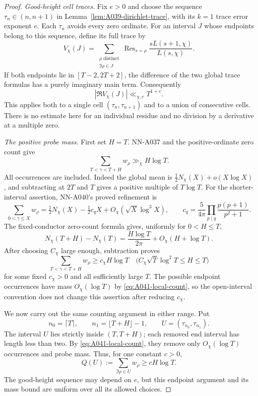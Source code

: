 \begin{proof}
\emph{Good-height cell traces.}
Fix $e>0$ and choose the sequence $\tau_n\in(n,n+1)$ in
Lemma~\ref{lem:A039-dirichlet-trace}, with its $k=1$ trace
error exponent $e$. Each $\tau_n$ avoids every zero ordinate.
For an interval $J$ whose endpoints belong to this sequence,
define its full trace by
\[
 V_\chi(J)=\sum_{\substack{\rho\text{ distinct}\\\Im\rho\in J}}
       \operatorname{Res}_{s=\rho}
                \frac{sL(s+1,\chi)}{L(s,\chi)}.
\]
If both endpoints lie in $[T-2,2T+2]$, the difference of the
two global trace formulas has a purely imaginary main term.
Consequently
\begin{equation}\label{eq:A041-trace-bound}
                   |\Re V_\chi(J)|\ll_{\chi,e}T^{1+e}.
\end{equation}
This applies both to a single cell $(\tau_n,\tau_{n+1})$ and
to a union of consecutive cells. There is no estimate here for
an individual residue and no division by a derivative at a
multiple zero.

\emph{The positive probe mass.}
First set $H=T$. NN-A037 and the positive-ordinate zero count give
\[
 \sum_{T<\gamma<T+H}w_\rho\gg_\chi H\log T.
\]
All occurrences are included. Indeed the global mean is
$\frac12N_\chi(X)+o(X\log X)$, and subtracting at $2T$ and
$T$ gives a positive multiple of $T\log T$.
For the shorter-interval assertion, NN-A040's proved refinement is
\[
 \sum_{0<\gamma\le X}w_\rho
 =\tfrac12N_\chi(X)-\tfrac12c_qX
                  +O_\chi(\sqrt X\log^3X),\qquad
 c_q=\frac5{4\pi}\prod_{p\mid q}\frac{p(p+1)}{p^2+1}.
\]
The fixed-conductor zero-count formula gives, uniformly for
$0<H\le T$,
\[
 N_\chi(T+H)-N_\chi(T)
       =\frac{H\log T}{2\pi}+O_\chi(H+\log T).
\]
After choosing $C_\chi$ large enough, subtraction proves
\begin{equation}\label{eq:A041-probe}
 \sum_{T<\gamma<T+H}w_\rho\ge c_\chi H\log T
 \quad\bigl(C_\chi\sqrt T\log^2T\le H\le T\bigr)
\end{equation}
for some fixed $c_\chi>0$ and all sufficiently large $T$.
The possible endpoint occurrences have mass $O_\chi(\log T)$
by \eqref{eq:A041-local-count}, so the open-interval convention
does not change this assertion after reducing $c_\chi$.

We now carry out the same counting argument in either range.
Put
\[
 n_0=\lceil T\rceil,\qquad n_1=\lfloor T+H\rfloor-1,
 \qquad U=(\tau_{n_0},\tau_{n_1}).
\]
The interval $U$ lies strictly inside $(T,T+H)$; each removed
end interval has length less than two. By
\eqref{eq:A041-local-count}, they remove only $O_\chi(\log T)$
occurrences and probe mass. Thus, for one constant $c>0$,
\begin{equation}\label{eq:A041-interior-mass}
                 Q(U):=\sum_{\Im\rho\in U}w_\rho
                                \ge c H\log T.
\end{equation}
The good-height sequence may depend on $e$, but this endpoint
argument and its mass bound are uniform over all its allowed
choices.


\end{proof}
